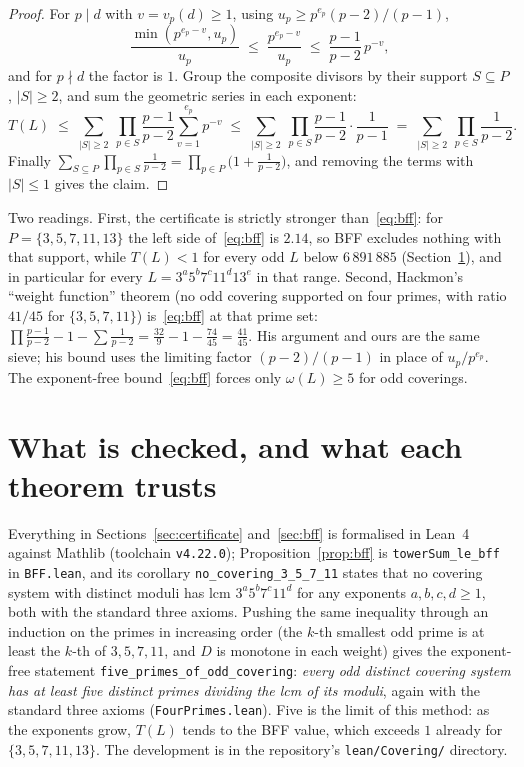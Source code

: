 \documentclass[11pt]{article}
\theoremstyle{definition}
\theoremstyle{remark}
\newcommand{\lean}[1]{\texttt{#1}}
\begin{document}
\begin{proof}
For $p \mid d$ with $v = v_p(d) \ge 1$, using $u_p \ge p^{e_p}(p-2)/(p-1)$,
\[
\frac{\min(p^{e_p - v}, u_p)}{u_p} \;\le\; \frac{p^{e_p - v}}{u_p} \;\le\; \frac{p-1}{p-2}\, p^{-v},
\]
and for $p \nmid d$ the factor is $1$. Group the composite divisors by their support $S \subseteq P$, $|S| \ge 2$, and sum the geometric series in each exponent:
\[
T(L) \;\le\; \sum_{|S| \ge 2}\ \prod_{p \in S} \frac{p-1}{p-2} \sum_{v=1}^{e_p} p^{-v}
\;\le\; \sum_{|S| \ge 2}\ \prod_{p \in S} \frac{p-1}{p-2}\cdot\frac{1}{p-1}
\;=\; \sum_{|S| \ge 2}\ \prod_{p \in S} \frac{1}{p-2}.
\]
Finally $\sum_{S \subseteq P} \prod_{p\in S} \frac1{p-2} = \prod_{p\in P}\bigl(1 + \frac1{p-2}\bigr)$, and removing the terms with $|S| \le 1$ gives the claim.
\end{proof}

Two readings. First, the certificate is strictly stronger than~\eqref{eq:bff}: for $P = \{3,5,7,11,13\}$ the left side of~\eqref{eq:bff} is $2.14$, so BFF excludes nothing with that support, while $T(L) < 1$ for every odd $L$ below $6\,891\,885$ (Section~\ref{sec:lean}), and in particular for every $L = 3^a 5^b 7^c 11^d 13^e$ in that range. Second, Hackmon's ``weight function'' theorem (no odd covering supported on four primes, with ratio $41/45$ for $\{3,5,7,11\}$) is~\eqref{eq:bff} at that prime set: $\prod \frac{p-1}{p-2} - 1 - \sum\frac{1}{p-2} = \frac{32}{9} - 1 - \frac{74}{45} = \frac{41}{45}$. His argument and ours are the same sieve; his bound uses the limiting factor $(p-2)/(p-1)$ in place of $u_p/p^{e_p}$. The exponent-free bound~\eqref{eq:bff} forces only $\omega(L) \ge 5$ for odd coverings.

\section{What is checked, and what each theorem trusts}\label{sec:lean}

Everything in Sections~\ref{sec:certificate} and~\ref{sec:bff} is formalised in Lean~4 against Mathlib (toolchain \lean{v4.22.0}); Proposition~\ref{prop:bff} is \lean{towerSum\_le\_bff} in \lean{BFF.lean}, and its corollary \lean{no\_covering\_3\_5\_7\_11} states that no covering system with distinct moduli has lcm $3^a5^b7^c11^d$ for any exponents $a,b,c,d \ge 1$, both with the standard three axioms. Pushing the same inequality through an induction on the primes in increasing order (the $k$-th smallest odd prime is at least the $k$-th of $3,5,7,11$, and $D$ is monotone in each weight) gives the exponent-free statement \lean{five\_primes\_of\_odd\_covering}: \emph{every odd distinct covering system has at least five distinct primes dividing the lcm of its moduli}, again with the standard three axioms (\lean{FourPrimes.lean}). Five is the limit of this method: as the exponents grow, $T(L)$ tends to the BFF value, which exceeds $1$ already for $\{3,5,7,11,13\}$. The development is in the repository's \lean{lean/Covering/} directory.
\end{document}
